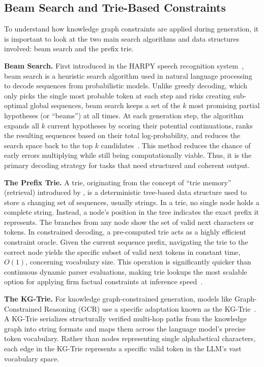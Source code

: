 \subsection{Beam Search and Trie-Based Constraints}

To understand how knowledge graph constraints are applied during generation, it is important to look at the two main search algorithms and data structures involved: beam search and the prefix trie.

\textbf{Beam Search.} First introduced in the HARPY speech recognition system~\citep{lowerre1976harpy}, beam search is a heuristic search algorithm used in natural language processing to decode sequences from probabilistic models. Unlike greedy decoding, which only picks the single most probable token at each step and risks creating sub-optimal global sequences, beam search keeps a set of the $k$ most promising partial hypotheses (or ``beams'') at all times. At each generation step, the algorithm expands all $k$ current hypotheses by scoring their potential continuations, ranks the resulting sequences based on their total log-probability, and reduces the search space back to the top $k$ candidates~\citep{holtzman2020curious}. This method reduces the chance of early errors multiplying while still being computationally viable. Thus, it is the primary decoding strategy for tasks that need structured and coherent output.

\textbf{The Prefix Trie.} A trie, originating from the concept of ``trie memory'' (retrieval) introduced by \citet{fredkin1960trie}, is a deterministic tree-based data structure used to store a changing set of sequences, usually strings. In a trie, no single node holds a complete string. Instead, a node's position in the tree indicates the exact prefix it represents. The branches from any node show the set of valid next characters or tokens. In constrained decoding, a pre-computed trie acts as a highly efficient constraint oracle. Given the current sequence prefix, navigating the trie to the correct node yields the specific subset of valid next tokens in constant time, $O(1)$, concerning vocabulary size. This operation is significantly quicker than continuous dynamic parser evaluations, making trie lookups the most scalable option for applying firm factual constraints at inference speed~\citep{willard2023outlines}.

\textbf{The KG-Trie.} For knowledge graph-constrained generation, models like Graph-Constrained Reasoning (GCR) use a specific adaptation known as the KG-Trie~\citep{luo2025-graph-constrained-reasoning}. A KG-Trie serializes structurally verified multi-hop paths from the knowledge graph into string formats and maps them across the language model's precise token vocabulary. Rather than nodes representing single alphabetical characters, each edge in the KG-Trie represents a specific valid token in the LLM's vast vocabulary space.

